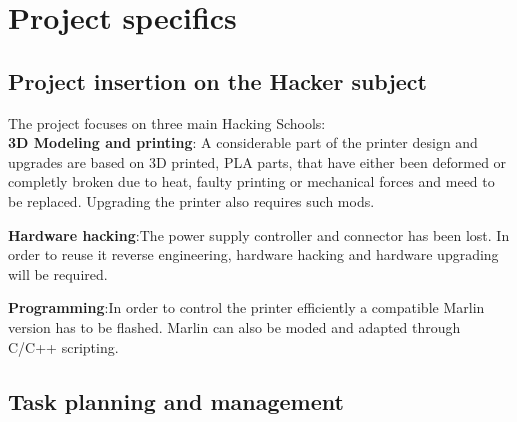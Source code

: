 \documentclass[a4paper,12pt]{article}
\begin{document}
	\section{Project specifics}
		
		\subsection{Project insertion on the Hacker subject}
		The project focuses on three main Hacking Schools: \\[0.5cm]
		\textbf{3D Modeling and printing}: A considerable part of the printer design and upgrades are based on 3D printed, PLA parts, that have either been deformed or completly broken due to heat, faulty printing or mechanical forces and meed to be replaced. Upgrading the printer also requires such mods. \par
		\textbf{Hardware hacking}:The power supply controller and connector has been lost. In order to reuse it reverse engineering, hardware hacking and hardware upgrading will be required. \par
		\textbf{Programming}:In order to control the printer efficiently a compatible Marlin version has to be flashed. Marlin can also be moded and adapted through C/C++ scripting.\par
		
		\clearpage
		\subsection{Task planning and management}
\end{document}
